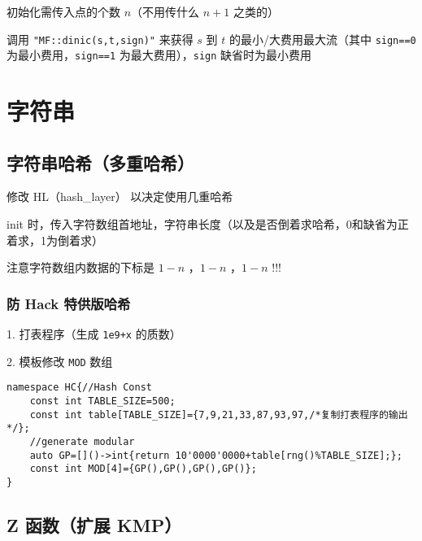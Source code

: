 \documentclass[12pt]{article}
\begin{document}
初始化需传入点的个数 $n$（不用传什么 $n+1$ 之类的）

调用 \texttt{"MF::dinic(s,t,sign)"} 来获得 $s$ 到 $t$ 的最小/大费用最大流（其中 \texttt{sign==0} 为最小费用，\texttt{sign==1} 为最大费用），\texttt{sign} 缺省时为最小费用



\newpage

{\centering\section{字符串}}

\subsection{字符串哈希（多重哈希）}

修改 HL（hash\_{}layer） 以决定使用几重哈希

init 时，传入字符数组首地址，字符串长度（以及是否倒着求哈希，0和缺省为正着求，1为倒着求）

注意字符数组内数据的下标是 $1-n$ ，$1-n$ ，$1-n$ !!!



\newpage

\subsubsection{防 Hack 特供版哈希}

1. 打表程序（生成 \texttt{1e9+x} 的质数）



2. 模板修改 \texttt{MOD} 数组

\begin{lstlisting}[style=C++]
namespace HC{//Hash Const
	const int TABLE_SIZE=500;
	const int table[TABLE_SIZE]={7,9,21,33,87,93,97,/*复制打表程序的输出*/};
	//generate modular
	auto GP=[]()->int{return 10'0000'0000+table[rng()%TABLE_SIZE];};
	const int MOD[4]={GP(),GP(),GP(),GP()};
}
\end{lstlisting}

\newpage

\subsection{Z 函数（扩展 KMP）}
\end{document}
